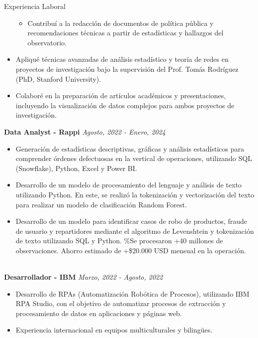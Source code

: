 \documentclass{resume}
\begin{document}
\begin{rSection}{Experiencia Laboral}
\begin{itemize}
\begin{itemize}
        \item Contribuí a la redacción de documentos de política pública y recomendaciones técnicas a partir de estadísticas y hallazgos del observatorio.
    \end{itemize}
    \item Apliqué técnicas avanzadas de análisis estadístico y teoría de redes en proyectos de investigación bajo la supervisión del Prof. Tomás Rodríguez (PhD, Stanford University).
    \item Colaboré en la preparación de artículos académicos y presentaciones, incluyendo la visualización de datos complejos para ambos proyectos de investigación.
\end{itemize}

{\bf Data Analyst - Rappi} \hfill {\em Agosto, 2022 - Enero, 2024} 
\begin{itemize}
    \item Generación de estadísticas descriptivas, gráficas y análisis estadísticos para comprender órdenes defectuosas en la vertical de operaciones, utilizando SQL (Snowflake), Python, Excel y Power BI. 
    \item Desarrollo de un modelo de procesamiento del lenguaje y análisis de texto utilizando Python. En este, se realizó la tokenización y vectorización del texto para realizar un modelo de clasificación Random Forest. %
    \item Desarrollo de un modelo para identificar casos de robo de productos, fraude de usuario y repartidores mediante el algoritmo de Levenshtein y tokenización de texto utilizando SQL y Python. \%Se procesaron +40 millones de observaciones. Ahorro estimado de +\$20.000 USD mensual en la operación.
\end{itemize}\\ 
{\bf Desarrollador - IBM} \hfill {\em Marzo, 2022 - Agosto, 2022} 
\begin{itemize}
    \item Desarrollo de RPAs (Automatización Robótica de Procesos), utilizando IBM RPA Studio, con el objetivo de automatizar procesos de extracción y procesamiento de datos  en aplicaciones y páginas web.
    \item Experiencia internacional en equipos multiculturales y bilingües.
\end{itemize}\\ 

\end{rSection}
\end{document}
